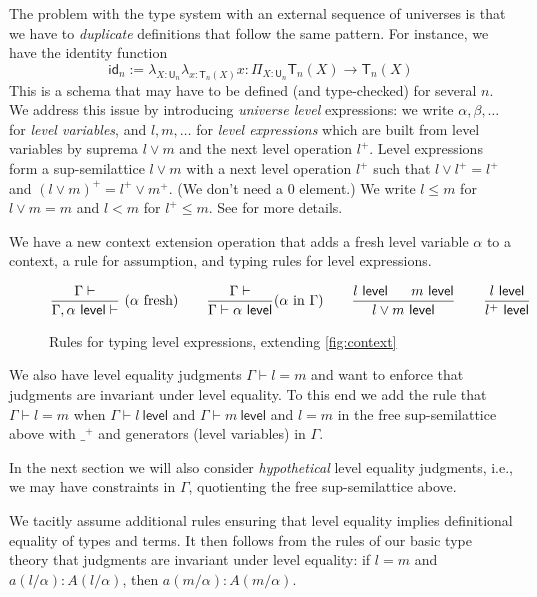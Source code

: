 \documentclass[11pt,a4paper]{article}
\theoremstyle{definition}
\newcommand{\id}{\mathsf{id}}
\newcommand{\UU}{\mathsf{U}}
\newcommand{\Level}{\mathsf{level}}
\newcommand{\mylam}[3]{\lambda_{#1:#2}#3}
\newcommand{\mypi}[3]{\Pi_{#1:#2}#3}
\newcommand{\T}{\mathsf{T}}
\begin{document}
The problem with the type system with an external sequence of universes
is that we have to \emph{duplicate} definitions that follow
the same pattern. For instance, we have the identity function
$$
\id_n := \mylam{X}{\UU_n}{\mylam{x}{\T_n(X)}{x}} : \mypi{X}{\UU_n}{\T_n(X)\rightarrow \T_n(X)}
$$
This is a schema that
may have to be defined (and type-checked) for several $n$.
We address this issue by introducing \emph{universe level}
expressions: we write $\alpha,\beta,\dots$
for \emph{level variables}, and $l,m,\dots$ for
\emph{level expressions} which are built from level variables
by suprema $l \vee m$ and the next level operation $l^+$.
Level expressions form a sup-semilattice $l\vee m$
with a next level operation $l^+$ such that $l \vee l^+ = l^+$
and $(l\vee m)^+ = l^+\vee m^+$. (We don't need a $0$ element.)
We write $l\leqslant m$ for $l\vee m = m$ and $l<m$ for $l^+\leqslant m$.
See \cite{bezem-coquand:lattices} for more details.


We have a new context extension operation that adds a fresh level variable
$\alpha$ to a context, a rule for assumption, and typing rules
for level expressions.

\begin{figure}[H]
  \caption{Rules for typing level expressions, extending
  \cref{fig:context}}\label{fig:contextL}
$$
\frac{\Gamma\vdash}{\Gamma,\alpha~\Level\vdash}~(\alpha~\text{fresh})~~~~~~
\frac{\Gamma\vdash}{\Gamma\vdash\alpha~\Level}(\alpha~\text{in}~\Gamma)~~~~~~
\frac{l~\Level~~~~~m~\Level}{l\vee m~\Level}~~~~~~
\frac{l~\Level}{l^+~\Level}
\belowdisplayshortskip 0pt
$$
\end{figure}

We also have level equality judgments $\Gamma\vdash l = m$
and want to enforce that judgments are invariant under level equality.
To this end we add the rule that $\Gamma\vdash l = m$
when $\Gamma\vdash l~\Level$ and $\Gamma\vdash m~\Level$ and
$l=m$ in the free sup-semilattice above with $\_^+$ and generators
(level variables) in $\Gamma$.

In the next section we will also consider \emph{hypothetical} level
equality judgments, i.e., we may have constraints in $\Gamma$,
quotienting the free sup-semilattice above.

We tacitly assume additional %
rules ensuring that level equality
implies definitional equality of types and terms.
It then follows from the rules of our basic type theory that
judgments are invariant under level equality: if $l=m$ and
${a(l/\alpha) : A(l/\alpha)}$, then ${a(m/\alpha) : A(m/\alpha)}$.
\end{document}
